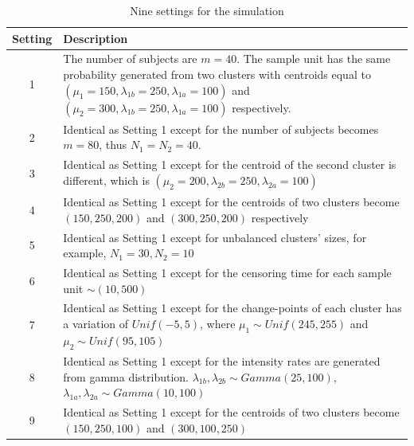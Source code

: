 \documentclass[12pt]{article}
\begin{document}
\begin{table}[htp]
  \caption{\label{tab:setd}Nine settings for the simulation}
    \vspace{1ex}
 \centering
 \begin{tabular}{cl}
\hline
Setting&\multicolumn{1}{p{14.5cm}}{Description }\\ \hline
1 & \multicolumn{1}{p{14.5cm}}{The number of subjects are $m=40$. The sample unit has the same probability generated from two clusters with centroids equal to $(\mu_1=150,\lambda_{1b}=250,\lambda_{1a}=100)$ and $(\mu_2=300,\lambda_{1b}=250,\lambda_{1a}=100)$ respectively.}\\

2& \multicolumn{1}{p{14.5cm}}{Identical as Setting 1 except for the number of subjects becomes $m=80$, thus $N_1 = N_2 = 40$. }\\

3& \multicolumn{1}{p{14.5cm}}{Identical as Setting 1 except for the centroid of the second cluster is different, which is  $(\mu_2=200,\lambda_{2b}=250,\lambda_{2a}=100)$}\\

4& \multicolumn{1}{p{14.5cm}}{Identical as Setting 1 except for the centroids of two clusters become $(150,250,200)$ and $(300,250,200)$ respectively}\\

5& \multicolumn{1}{p{14.5cm}}{Identical as Setting 1  except for unbalanced clusters' sizes, for example, $N_1 = 30, N_2 = 10$}\\

6& \multicolumn{1}{p{14.5cm}}{Identical as Setting 1  except for the censoring time for each sample unit $ \sim (10, 500)$}\\

7& \multicolumn{1}{p{14.5cm}}{Identical as Setting 1  except for the change-points of each cluster has a variation of $Unif(-5, 5)$, where $\mu_1 \sim Unif(245, 255)$ and $\mu_2 \sim Unif(95, 105)$}\\

8& \multicolumn{1}{p{14.5cm}}{Identical as Setting 1  except for the intensity rates are generated from gamma distribution.  $\lambda_{1b},\lambda_{2b} \sim Gamma(25, 100)$, $\lambda_{1a},\lambda_{2a}\sim Gamma(10, 100)$ }\\

9& \multicolumn{1}{p{14.5cm}}{Identical as Setting 1  except for the centroids of two clusters become $(150,250,100)$ and $(300,100,250)$}\\


\end{tabular}
\end{table}
\end{document}
